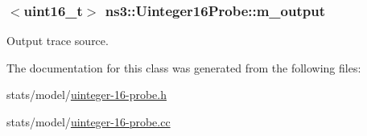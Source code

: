 \subsubsection[{\texorpdfstring{m\+\_\+output}{m_output}}]{$<$uint16\+\_\+t$>$ ns3\+::\+Uinteger16\+Probe\+::m\+\_\+output\hspace{0.3cm}{\ttfamily [private]}}\hypertarget{classns3_1_1Uinteger16Probe_a564e98cfa593942428b2346c6926b3aa}{}\label{classns3_1_1Uinteger16Probe_a564e98cfa593942428b2346c6926b3aa}


Output trace source. 



The documentation for this class was generated from the following files\+:\begin{DoxyCompactItemize}
\item 
stats/model/\hyperlink{uinteger-16-probe_8h}{uinteger-\/16-\/probe.\+h}\item 
stats/model/\hyperlink{uinteger-16-probe_8cc}{uinteger-\/16-\/probe.\+cc}\end{DoxyCompactItemize}
